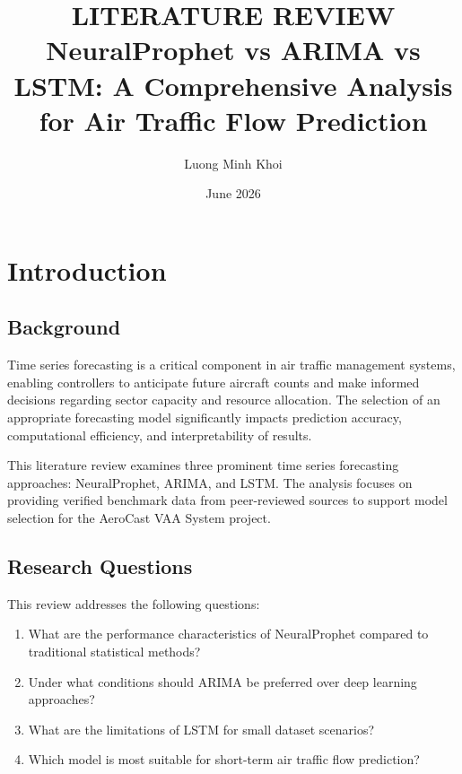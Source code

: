 \documentclass[12pt,a4paper]{article}
\title{\textbf{LITERATURE REVIEW} \\ \large NeuralProphet vs ARIMA vs LSTM: A Comprehensive Analysis for Air Traffic Flow Prediction}
\author{Luong Minh Khoi}
\date{June 2026}
\begin{document}
\maketitle


\section{Introduction}

\subsection{Background}

Time series forecasting is a critical component in air traffic management systems, enabling controllers to anticipate future aircraft counts and make informed decisions regarding sector capacity and resource allocation. The selection of an appropriate forecasting model significantly impacts prediction accuracy, computational efficiency, and interpretability of results.

This literature review examines three prominent time series forecasting approaches: NeuralProphet, ARIMA, and LSTM. The analysis focuses on providing verified benchmark data from peer-reviewed sources to support model selection for the AeroCast VAA System project.

\subsection{Research Questions}

This review addresses the following questions:

\begin{enumerate}
    \item What are the performance characteristics of NeuralProphet compared to traditional statistical methods?
    \item Under what conditions should ARIMA be preferred over deep learning approaches?
    \item What are the limitations of LSTM for small dataset scenarios?
    \item Which model is most suitable for short-term air traffic flow prediction?
\end{enumerate}
\end{document}
